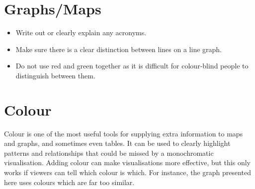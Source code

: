 \documentclass[
]{book}
\newenvironment{Shaded}{\begin{snugshade}}{\end{snugshade}}
\newcommand{\CharTok}[1]{\textcolor[rgb]{0.31,0.60,0.02}{#1}}
\newcommand{\CommentTok}[1]{\textcolor[rgb]{0.56,0.35,0.01}{\textit{#1}}}
\newcommand{\DataTypeTok}[1]{\textcolor[rgb]{0.13,0.29,0.53}{#1}}
\newcommand{\FloatTok}[1]{\textcolor[rgb]{0.00,0.00,0.81}{#1}}
\newcommand{\KeywordTok}[1]{\textcolor[rgb]{0.13,0.29,0.53}{\textbf{#1}}}
\newcommand{\NormalTok}[1]{#1}
\newcommand{\OperatorTok}[1]{\textcolor[rgb]{0.81,0.36,0.00}{\textbf{#1}}}
\newcommand{\StringTok}[1]{\textcolor[rgb]{0.31,0.60,0.02}{#1}}
\providecommand{\tightlist}{%
  \setlength{\itemsep}{0pt}\setlength{\parskip}{0pt}}
\begin{document}
\hypertarget{graphsmaps}{%
\section{Graphs/Maps}\label{graphsmaps}}

\begin{itemize}
\tightlist
\item
  Write out or clearly explain any acronyms.
\item
  Make sure there is a clear distinction between lines on a line graph.
\item
  Do not use red and green together as it is difficult for colour-blind people to distinguish between them.
\end{itemize}

\hypertarget{colour}{%
\section{Colour}\label{colour}}

Colour is one of the most useful tools for supplying extra information to maps and graphs, and sometimes even tables. It can be used to clearly highlight patterns and relationships that could be missed by a monochromatic visualisation. Adding colour can make visualisations more effective, but this only works if viewers can tell which colour is which. For instance, the graph presented here uses colours which are far too similar.

\begin{Shaded}
\end{Shaded}
\end{document}
